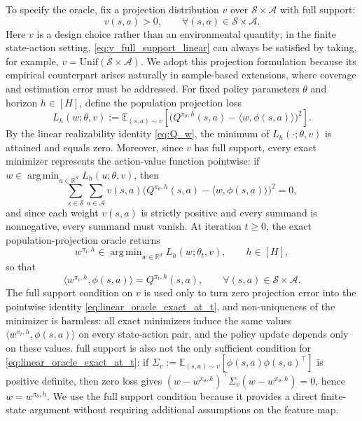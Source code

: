 \documentclass[11pt]{article}
\DeclareMathOperator*{\argmin}{arg\,min}
\begin{document}
To specify the oracle, fix a projection distribution $v$ over
$\mathcal S\times\mathcal A$ with full support:
\begin{equation}
\label{eq:v_full_support_linear}
    v(s,a)>0,
    \qquad
    \forall (s,a)\in\mathcal S\times\mathcal A .
\end{equation}
Here $v$ is a design choice rather than an environmental quantity; in the
finite state-action setting, \eqref{eq:v_full_support_linear} can always be
satisfied by taking, for example, $v=\mathrm{Unif}(\mathcal S\times\mathcal A)$. We adopt this projection formulation because its empirical counterpart arises
naturally in sample-based extensions, where coverage and estimation error must
be addressed. For fixed policy parameters $\theta$ and
horizon $h\in[H]$, define the population projection loss
\begin{equation}
\label{eq:linear_population_projection_loss}
    L_h(w;\theta,v)
    :=
    \mathbb E_{(s,a)\sim v}
    \left[
    \big(
    Q^{\pi_\theta,h}(s,a)-\langle w,\phi(s,a)\rangle
    \big)^2
    \right].
\end{equation}
By the linear realizability identity \eqref{eq:Q_w}, the minimum of
$L_h(\cdot;\theta,v)$ is attained and equals zero. Moreover, since $v$ has
full support, every exact minimizer represents the action-value function
pointwise: if $w\in\argmin_{u\in\mathbb R^d}L_h(u;\theta,v)$, then
\[
\sum_{s\in\mathcal S}\sum_{a\in\mathcal A}
v(s,a)
\big(
Q^{\pi_\theta,h}(s,a)-\langle w,\phi(s,a)\rangle
\big)^2
=0,
\]
and since each weight $v(s,a)$ is strictly positive and every summand is
nonnegative, every summand must vanish. At iteration $t\ge0$, the exact
population-projection oracle returns
\begin{equation}
\label{eq:linear_projection_oracle_choice}
    w^{\pi_t,h}
    \in
    \argmin_{w\in\mathbb R^d}L_h(w;\theta_t,v),
    \qquad h\in[H],
\end{equation}
so that
\begin{equation}
\label{eq:linear_oracle_exact_at_t}
    \langle w^{\pi_t,h},\phi(s,a)\rangle
    =
    Q^{\pi_t,h}(s,a),
    \qquad
    \forall (s,a)\in\mathcal S\times\mathcal A .
\end{equation}
The full support condition on $v$ is used only to turn zero projection error
into the pointwise identity \eqref{eq:linear_oracle_exact_at_t}, and
non-uniqueness of the minimizer is harmless: all exact minimizers induce the
same values $\langle w^{\pi_t,h},\phi(s,a)\rangle$ on every state-action pair,
and the policy update depends only on these values. full support is also not
the only sufficient condition for \eqref{eq:linear_oracle_exact_at_t}: if
$\Sigma_v:=\mathbb E_{(s,a)\sim v}[\phi(s,a)\phi(s,a)^\top]$ is positive
definite, then zero loss gives
$(w-w^{\pi_\theta,h})^\top\Sigma_v(w-w^{\pi_\theta,h})=0$, hence
$w=w^{\pi_\theta,h}$. We use the full support condition because it provides a direct finite-state
argument without requiring additional assumptions on the feature map.
\end{document}
